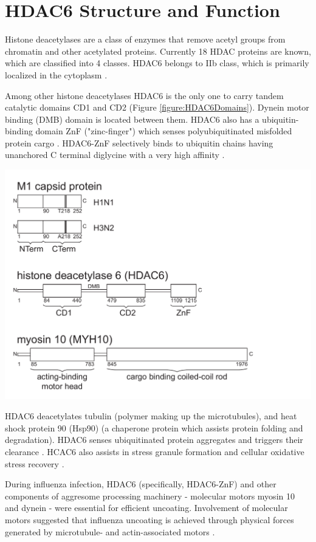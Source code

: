 \section{HDAC6 Structure and Function}

Histone deacetylases are a class of enzymes that remove acetyl groups from chromatin and other acetylated proteins. Currently 18 HDAC proteins are known, which are classified into 4 classes. HDAC6 belongs to IIb class, which is primarily localized in the cytoplasm \cite{hai2016histone}.

Among other histone deacetylases HDAC6 is the only one to carry tandem catalytic domains CD1 and CD2 (Figure \ref{figure:HDAC6Domains}). Dynein motor binding (DMB) domain is located between them. HDAC6 also has a ubiquitin-binding domain ZnF ("zinc-finger") which senses polyubiquitinated misfolded protein cargo \cite{hai2016histone}. HDAC6-ZnF selectively binds to ubiquitin chains having unanchored C terminal diglycine \cite{ouyang2012protein} with a very high affinity \cite{zhang2008mice}.

\begin{center}
\includegraphics[width=1\textwidth, trim={0cm 6cm 8cm 8.8cm}, clip]{D_chapters/0_introduction/protein_domains.pdf}
\label{figure:HDAC6Domains}
\end{center}

HDAC6 deacetylates tubulin \cite{zhang2003hdac, zhang2008mice} (polymer making up the microtubules), and heat shock protein 90 (Hsp90) \cite{kovacs2005hdac6} (a chaperone protein which assists protein folding and degradation). HDAC6 senses ubiquitinated protein aggregates and triggers their clearance \cite{boyault2007hdac6}. HCAC6 also assists in stress granule formation and cellular oxidative stress recovery \cite{kwon2007deacetylase}.

During influenza infection, HDAC6 (specifically, HDAC6-ZnF) and other components of aggresome processing machinery - molecular motors myosin 10 and dynein - were essential for efficient uncoating. Involvement of molecular motors suggested that influenza uncoating is achieved through physical forces generated by microtubule- and actin-associated motors \cite{banerjee2014influenza}.

